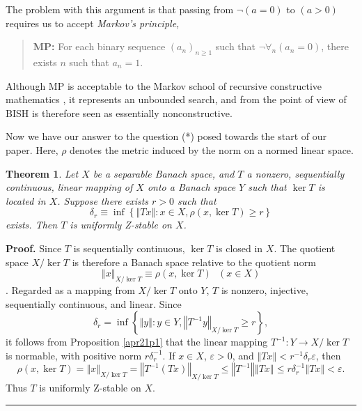 \documentclass[11pt]{article}%
\newtheorem{theorem}{Theorem}
\newenvironment{proof}[1][Proof]{\noindent\textbf{#1.} }{\ \rule{0.5em}{0.5em}}
\begin{document}
%

\noindent
The problem with this argument is that passing from $\lnot(a=0)$ to $\left(
a>0\right)  $ requires us to accept \emph{Markov's principle,}

\begin{quote}
\textbf{MP: }For each binary sequence $\left(  a_{n}\right)  _{n\geq1}$ such
that $\lnot\forall_{n}(a_{n}=0)$, there exists $n$ such that $a_{n}=1$.
\end{quote}

%

\noindent
Although MP is acceptable to the Markov school of recursive constructive
mathematics \cite{Kushner}, it represents an unbounded search, and from the
point of view of BISH is therefore seen as essentially nonconstructive.

Now we have our answer to the question (*) posed towards the start of our
paper. Here, $\rho$ denotes the metric induced by the norm on a normed linear space.

\begin{theorem}
\label{apr21c1}Let $X$ be a separable Banach space, and $T$ a nonzero,
sequentially continuous, linear mapping of $X$ onto a Banach space $Y$ such
that $\ker T$ is located in $X$. Suppose there exists $r>0$ such that%
\[
\delta_{r}\equiv\inf\left\{  \left\Vert Tx\right\Vert :x\in X,\rho(x,\ker
T)\geq r\right\}
\]
exists. Then $T$ is uniformly Z-stable on $X$.
\end{theorem}

\begin{proof}
Since $T$ is sequentially continuous, $\ker T$ is closed in $X$. The quotient
space $X/\ker T$ is therefore a Banach space relative to the quotient norm%
\[
\left\Vert x\right\Vert _{X/\ker T}\equiv\rho(x,\ker T)\ \ \ (x\in X)
\]
\cite[2.3.8]{BVtech}. Regarded as a mapping from $X/\ker T$ onto $Y$, $T$ is
nonzero, injective, sequentially continuous, and linear. Since%
\[
\delta_{r}=\inf\left\{  \left\Vert y\right\Vert :y\in Y,\left\Vert
T^{-1}y\right\Vert _{X/\ker T}\geq r\right\}  ,
\]
it follows from Proposition \ref{apr21p1} that the linear mapping
$T^{-1}:Y\rightarrow X/\ker T$ is normable, with positive norm $r\delta
_{r}^{-1}$. If $x\in X$, $\varepsilon>0$, and $\left\Vert Tx\right\Vert
<r^{-1}\delta_{r}\varepsilon$, then%
\[
\rho(x,\ker T)=\left\Vert x\right\Vert _{X/\ker T}=\left\Vert T^{-1}%
(Tx)\right\Vert _{X/\ker T}\leq\left\Vert T^{-1}\right\Vert \left\Vert
Tx\right\Vert \leq r\delta_{r}^{-1}\left\Vert Tx\right\Vert <\varepsilon.
\]
Thus $T$ is uniformly Z-stable on $X$.
\end{proof}
\end{document}
